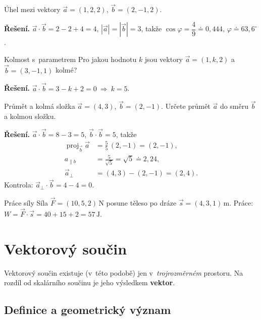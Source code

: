 \documentclass[a4paper,11pt]{article}
\newcommand{\abs}[1]{\left\lvert #1\right\rvert}
\newcommand{\jed}[1]{\,\mathrm{#1}}      %
\newcommand{\dc}{{,}}                    %
\DeclareMathOperator{\proj}{proj}
\begin{document}
\begin{priklad}{Úhel mezi vektory}
$\vec a=(1,2,2)$, $\vec b=(2,-1,2)$.

\medskip\noindent\textbf{Řešení.}
$\vec a\cdot\vec b=2-2+4=4$, $\abs{\vec a}=\abs{\vec b}=3$, takže
$\cos\varphi=\dfrac{4}{9}\doteq0\dc444$, $\varphi\doteq63\dc6^\circ$.
\end{priklad}

\begin{priklad}{Kolmost s~parametrem}
Pro jakou hodnotu $k$ jsou vektory $\vec a=(1,k,2)$ a $\vec b=(3,-1,1)$ kolmé?

\medskip\noindent\textbf{Řešení.} $\vec a\cdot\vec b=3-k+2=0\ \Rightarrow\ k=5$.
\end{priklad}

\begin{priklad}{Průmět a kolmá složka}
$\vec a=(4,3)$, $\vec b=(2,-1)$. Určete průmět $\vec a$ do směru $\vec b$ a kolmou složku.

\medskip\noindent\textbf{Řešení.}
$\vec a\cdot\vec b=8-3=5$, $\vec b\cdot\vec b=5$, takže
\begin{align*}
  \proj_{\vec b}\vec a&=\frac55\,(2,-1)=(2,-1),\\
  a_{\parallel b}&=\frac{5}{\sqrt5}=\sqrt5\doteq2\dc24,\\
  \vec a_\perp&=(4,3)-(2,-1)=(2,4).
\end{align*}
Kontrola: $\vec a_\perp\cdot\vec b=4-4=0$. \checkmark
\end{priklad}

\begin{priklad}{Práce síly}
Síla $\vec F=(10,5,2)\jed{N}$ posune těleso po dráze $\vec s=(4,3,1)\jed{m}$.
Práce: $W=\vec F\cdot\vec s=40+15+2=57\jed{J}$.
\end{priklad}

\section{Vektorový součin}

Vektorový součin existuje (v~této podobě) jen v~\emph{trojrozměrném} prostoru.
Na rozdíl od skalárního součinu je jeho výsledkem \textbf{vektor}.

\subsection{Definice a geometrický význam}
\end{document}
